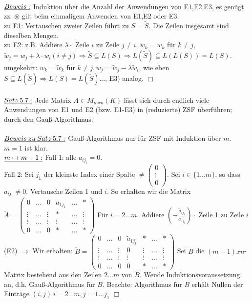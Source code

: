\documentclass[fleqn, a4paper, 11pt]{article}
\begin{document}
\\
$\uline{Beweis:}$ Induktion \"uber die Anzahl der Anwendungen von E1,E2,E3, es gen\"ugt zz: $\circledast$ gilt beim einmaligem Anwenden von E1,E2 oder E3.\\
zu E1: Vertauschen zweier Zeilen f\"uhrt zu $S=\tilde{S}$. Die Zeilen insgesamt sind dieselben Mengen.\\
zu E2: z.B. Addiere $\lambda\cdot$ Zeile $i$ zu Zeile $j\neq i$. $\tilde{w}_k =w_k$ f\"ur $k\neq j$, $\tilde{w}_j=w_j +\lambda\cdot w_i (i\neq j)\Rightarrow \tilde{S}\subseteq L(S)\Rightarrow L(\tilde{S})\subseteq L(L(S))=L(S)$. umgekehrt: $w_k=\tilde{w}_k$ f\"ur $k\neq j, w_j=\tilde{w}_j -\lambda\tilde{w}_i$, wie eben $S\subseteq L(\tilde{S})\Rightarrow L(S)=L(\tilde{S})$..., E3) analog. \hfill $\Box$\\
\\
$\uline{Satz\:5.7:}$ Jede Matrix $A\in M_{mxn}(K)$ l\"asst sich durch endlich viele Anwendungen von E1 und E2 (bzw. E1-E3) in (reduzierte) ZSF \"uberf\"uhren; durch den Gau\ss{}-Algorithmus.\\
\\
$\uline{Beweis\:zu\:Satz\:5.7:}$ Gau\ss{}-Algorithmus nur f\"ur ZSF mit Induktion \"uber $m$. $m=1$ ist klar.\\
$\uline{m\mapsto m+1:}$ Fall 1: alle $a_{ij_i}=0$.\\
Fall 2: Sei $j_1$ der kleinste Index einer Spalte $\neq\begin{pmatrix}
	0\\
	\vdots\\
	0
\end{pmatrix}$. Sei $i\in\{1...m\}$, so dass $a_{ij_1}\neq 0$. Vertausche Zeilen 1 und $i$. So erhalten wir die Matrix $\tilde{A}=\begin{pmatrix}
	0 & \dots & 0 & \tilde{a}_{1j_1} & \dots & \ast \\
	\vdots & \dots & \vdots & \ast & \dots & \vdots \\
	\vdots & \dots & \vdots & \vdots & \dots & \vdots \\
	0 & \dots & 0 & \ast & \dots & \ast
\end{pmatrix}$ F\"ur $i=2...m$. Addiere $(-\tfrac{\tilde{a}_{ij_1}}{\tilde{a}_{1j_1}})\cdot$ Zeile 1 zu Zeile $i$ (E2) $\rightarrow$ Wir erhalten: $\tilde{B}=\begin{pmatrix}
	0 & \dots & 0 & \tilde{a}_{1j_1} & \ast & \dots & \ast \\
	\vdots & \dots & \vdots & 0 & \vdots & \dots & \vdots \\
	\vdots & \dots & \vdots & \vdots & \vdots & \dots & \vdots \\
	0 & \dots & 0 & 0 & \ast & \dots & \ast
\end{pmatrix}$ Sei $B$ die $(m-1)xn$-Matrix bestehend aus den Zeilen $2...m$ von $\tilde{B}$. Wende Induktionsvoraussetzung an, d.h. Gau\ss{}-Algorithmus f\"ur $B$. Beachte: Algorithmus f\"ur $B$ erh\"alt Nullen der Eintr\"age $(i,j)\:i=2...m, j=1...j_1$ \hfill $\Box$\\
\end{document}
